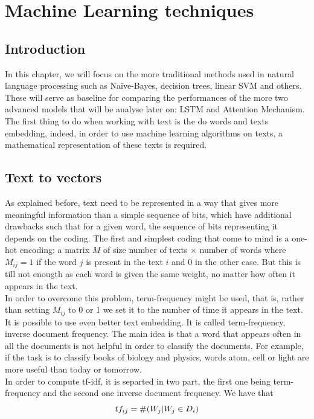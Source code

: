 \chapter{Machine Learning techniques} \label{chap3}
\section{Introduction}
In this chapter, we will focus on the more traditional methods used in natural language processing such as Na\"{i}ve-Bayes, decision trees, linear SVM and others. These will serve as baseline for comparing the performances of the more two advanced models that will be analyse later on: LSTM and Attention Mechanism. The first thing to do when working with text is the do words and texts embedding, indeed, in order to use machine learning algorithms on texts, a mathematical representation of these texts is required. 

\section{Text to vectors}
As explained before, text need to be represented in a way that gives more meaningful information than a simple sequence of bits, which have additional drawbacks such that for a given word, the sequence of bits representing it depends on the coding.
 The first and simplest coding that come to mind is a one-hot encoding: a matrix $M$ of size number of texts $\times$ number of words where $M_{ij} = 1$ if the word $j$ is present in the text  $i$ and $0$ in the other case. But this is till not enougth as each word is given the same weight, no matter how often it appears in the text. \\ 

 In order to overcome this problem, term-frequency might be used, that is, rather than setting $M_{ij}$ to 0 or 1 we set it to the number of time it appears in the text. \\ 

 It is possible to use even better text embedding. It is called term-frequency, inverse document frequency. The main idea is that a word that appears often in all the documents is not helpful in order to classify the documents. For example, if the task is to classify books of biology and physics, words atom, cell or light are more useful than today or tomorrow. \\

In order to compute tf-idf, it is separted in two part, the first one being term-frequency and the second one inverse document frequency. We have that \begin{equation}
	tf_{ij} = \#(W_j | W_j \in D_i)\\ 
\end{equation}

